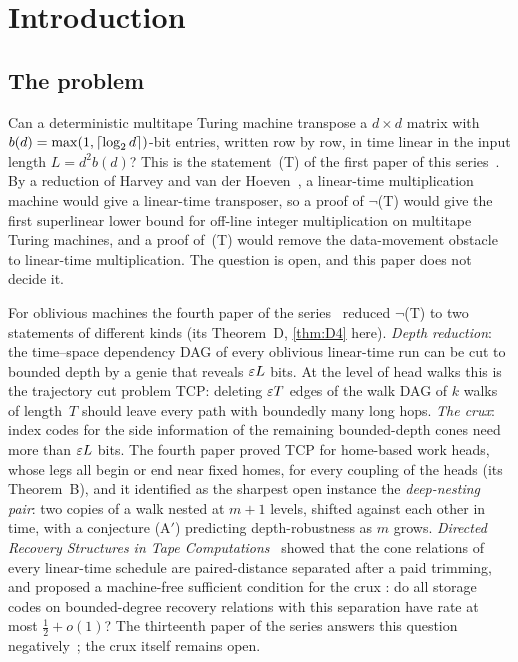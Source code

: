 \section{Introduction}\label{sec:intro}

\subsection{The problem}

Can a deterministic multitape Turing machine transpose a $d\times d$ matrix with $b(d)=\max(1,\lceil \log_2 d \rceil)$-bit entries, written
row by row, in time linear in the input length $L=d^2b(d)$? This is the statement~(T) of the first paper of this
series~\cite{FirstPaper2026}. By a reduction of Harvey and van der Hoeven~\cite[Cor.~6.9]{HvdH2025}, a linear-time
multiplication machine would give a linear-time transposer, so a proof of $\neg$(T) would give the first superlinear lower
bound for off-line integer multiplication on multitape Turing machines, and a proof of~(T) would remove the data-movement
obstacle to linear-time multiplication. The question is open, and this paper does not decide it.

For oblivious machines the fourth paper of the series~\cite{FourthPaper2026} reduced $\neg$(T) to two statements of different
kinds (its Theorem~D, \cref{thm:D4} here). \emph{Depth reduction}: the time--space dependency DAG of every oblivious linear-time
run can be cut to bounded depth by a genie that reveals $\varepsilon L$ bits. At the level of head walks this is the trajectory cut
problem TCP: deleting $\varepsilon T$ edges of the walk DAG of $k$ walks of length~$T$ should leave every path with boundedly many long
hops. \emph{The crux}: index codes for the side information of the remaining bounded-depth cones need more than $\varepsilon L$ bits.
The fourth paper proved TCP for home-based work heads, whose legs all begin or end near fixed homes, for every coupling of the
heads (its Theorem~B), and it identified as the sharpest open instance the \emph{deep-nesting pair}: two copies of a walk nested
at $m+1$ levels, shifted against each other in time, with a conjecture (A$'$) predicting depth-robustness as $m$ grows.
\emph{Directed Recovery Structures in Tape Computations}~\cite{DirectedRecovery2026} showed that the cone relations of every
linear-time schedule are paired-distance separated after a paid trimming, and proposed a machine-free sufficient condition for
the crux \cite[Question~9.1]{DirectedRecovery2026}: do all storage codes on bounded-degree recovery relations with this
separation have rate at most $\frac12+o(1)$? The thirteenth paper of the series answers this question
negatively~\cite[Theorem~A and Corollary~A$'$]{StorageCodes2026}; the crux itself remains open.

